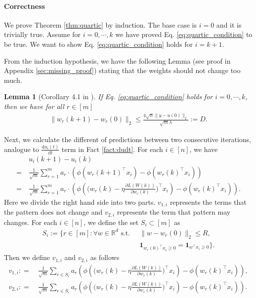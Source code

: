 \documentclass[11pt]{article}
\renewcommand{\d}{\mathrm{d}}
\newcommand{\ov}{\overline}
\newtheorem{lemma}[theorem]{Lemma}
\begin{document}
\paragraph{Correctness}
We prove Theorem \ref{thm:quartic} by induction.
The base case is $i=0$ and it is trivially true.
Assume for $i=0,\cdots,k$ we have proved Eq. \eqref{eq:quartic_condition} to be true.
We want to show Eq. \eqref{eq:quartic_condition} holds for $i=k+1$.

From the induction hypothesis,
we have the following Lemma (see proof in Appendix \ref{sec:missing_proof}) stating that the weights should not change too much.
\begin{lemma}[Corollary 4.1 in \cite{dzps19}]\label{lem:4.1}
If Eq. \eqref{eq:quartic_condition} holds for $i = 0, \cdots, k$, then we have for all $r\in [m]$
\begin{align*}
\| w_r(k+1) - w_r(0) \|_2 \leq \frac{ 4 \sqrt{n} \| y - u (0) \|_2 }{ \sqrt{m} \lambda } := D.
\end{align*}
\end{lemma}


Next, we calculate the different of predictions between two consecutive iterations, analogue to $\frac{\d u_i(t)}{ \d t }$ term in Fact \ref{fact:dudt}.
For each $i \in [n]$, we have
{%
\begin{align*}
& ~ u_i(k+1) - u_i(k) \\
= & ~ \frac{1}{ \sqrt{m} } \sum_{r=1}^m a_r \cdot \left( \phi( w_r(k+1)^\top x_i ) - \phi(w_r(k)^\top x_i ) \right) \\
= & ~ \frac{1}{\sqrt{m}} \sum_{r=1}^m a_r \cdot \left( \phi \left( \Big( w_r(k) - \eta \frac{ \partial L( W(k) ) }{ \partial w_r(k) } \Big)^\top x_i \right) - \phi ( w_r(k)^\top x_i ) \right).
\end{align*}
}
Here we divide the right hand side into two parts. $v_{1,i}$ represents the terms that the pattern does not change and $v_{2,i}$ represents the term that pattern may changes. For each $i \in [n]$,
we define the set $S_i\subset [m]$ as
\begin{align*}
    S_i:=\{r\in [m]:\forall 
    w\in \mathbb{R}^d \text{ s.t. } & ~ \|w-w_r(0)\|_2\leq R,\\
    & ~ \mathbf{1}_{w_r(0)^\top x_i\geq 0}=\mathbf{1}_{w^\top x_i\geq 0}\}.
\end{align*}
Then we define $v_{1,i}$ and $v_{2,i}$ as follows
{%
\begin{align*}
v_{1,i} : = & ~ \frac{1}{ \sqrt{m} } \sum_{r \in S_i} a_r \left( \phi \left( \Big( w_r(k) - \eta \frac{ \partial L(W(k)) }{ \partial w_r(k) } \Big)^\top x_i \right) - \phi( w_r(k)^\top x_i ) \right), \\
v_{2,i} : = & ~ \frac{1}{ \sqrt{m} } \sum_{r \in \ov{S}_i} a_r \left( \phi \left( \Big( w_r(k) - \eta \frac{ \partial L(W(k)) }{ \partial w_r(k) } \Big)^\top x_i \right) - \phi( w_r(k)^\top x_i ) \right) .
\end{align*} 
}
\end{document}
